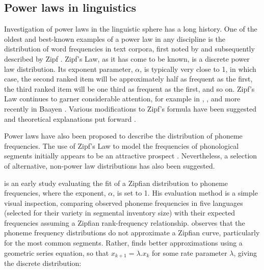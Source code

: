 \hypertarget{power-laws-linguistics}{%
\subsection{Power laws in linguistics}\label{power-laws-linguistics}}

Investigation of power laws in the linguistic sphere has a long history. One of the oldest and best-known examples of a power law in any discipline is the distribution of word frequencies in text corpora, first noted by \textcite{estoup_gammes_1916} and subsequently described by Zipf \autocites*{zipf_selective_1932}{zipf_human_1949}. Zipf's Law, as it has come to be known, is a discrete power law distribution. Its exponent parameter, \(\alpha\), is typically very close to 1, in which case, the second ranked item will be approximately half as frequent as the first, the third ranked item will be one third as frequent as the first, and so on. Zipf's Law continues to garner considerable attention, for example in \textcite{kucera_computational_1967}, \textcite{montemurro_beyond_2001}, and more recently in Baayen \autocites*{baayen_word_2001}{baayen_analyzing_2008}. Various modifications to Zipf's formula have been suggested \autocite[notably][]{mandelbrot_structure_1954} and theoretical explanations put forward \autocites{li_random_1992}{naranan_information_1992}{naranan_models_1998}.

Power laws have also been proposed to describe the distribution of phoneme frequencies. The use of Zipf's Law to model the frequencies of phonological segments initially appears to be an attractive prospect \autocite[pp.~565--566]{witten_source_1990}. Nevertheless, a selection of alternative, non-power law distributions has also been suggested.

\textcite{sigurd_rank-frequency_1968} is an early study evaluating the fit of a Zipfian distribution to phoneme frequencies, where the exponent, \(\alpha\), is set to 1. His evaluation method is a simple visual inspection, comparing observed phoneme frequencies in five languages (selected for their variety in segmental inventory size) with their expected frequencies assuming a Zipfian rank-frequency relationship. \textcite[p.~8]{sigurd_rank-frequency_1968} observes that the phoneme frequency distributions do not approximate a Zipfian curve, particularly for the most common segments. Rather, \textcite{sigurd_rank-frequency_1968} finds better approximations using a geometric series equation, so that \(x_{k+1} = \lambda.x_k\) for some rate parameter \(\lambda\), giving the discrete distribution:

